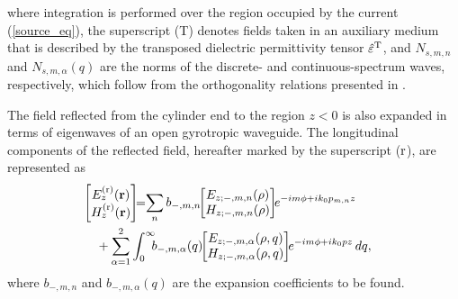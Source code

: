 \documentclass[summary]{URSIGASS2020}
\def\f{\phi}
\begin{document}
where integration is performed over the region occupied by the current (\ref{source_eq}), the superscript (T) denotes fields taken in an auxiliary medium that is described by the transposed dielectric permittivity tensor ${\hat{\varepsilon}}^{\rm T}$, and $ N_{s,m,n} $ and $ N_{s,m,\alpha}(q) $ are the norms of the discrete- and continuous-spectrum waves, respectively, which follow from the orthogonality relations presented in \cite{EskinPIERS2017_meth}.

The field reflected from the cylinder end to the region $ z<0 $ is also expanded in terms of eigenwaves of an open gyrotropic waveguide.
The longitudinal components of the reflected field, hereafter marked by the superscript ($ \rm r $), are represented as
\begin{align}\label{eq6}
&\hspace{-4mm}\left[\!\!\!
\begin{array}{c}
{E_z^{(\rm r)}}({\bf r})\\
{H_z^{(\rm r)}}({\bf r})
\end{array}\!\!\!\right]\!\!{=}\!\sum\limits_{n} b_{-,m,n}\!\!\left[\!\!\!
\begin{array}{c}
{E}_{z;-,m,n}(\rho)\\
{H}_{z;-,m,n}(\rho)
\end{array}\!\!\!\right]\!\!e^{-im\f + ik_0 p_{m,n}z}\notag\\
&+ \sum\limits_{\alpha=1}^{2}\int_{0}^{\infty}\!\!\!b_{-,m,\alpha}(q)\!\!\left[\!\!\!
\begin{array}{c}
{E}_{z;-,m,\alpha}(\rho,q)\\
{H}_{z;-,m,\alpha}(\rho,q)
\end{array}\!\!\!\right]\!\!e^{-im\f + ik_0 p z}\,dq,
\end{align}
where $ b_{-,m,n} $ and $ b_{-,m,\alpha}(q) $ are the expansion coefficients to be found.
\end{document}
